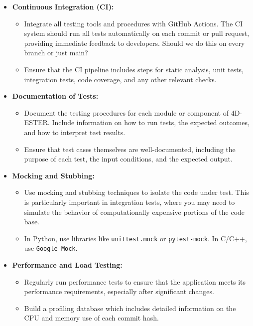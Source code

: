 \documentclass{ol-softwaremanual}
\begin{document}
\begin{itemize}
    \item \textbf{Continuous Integration (CI):}
    \begin{itemize}
        \item Integrate all testing tools and procedures with GitHub Actions. The CI system should run all tests automatically on each commit or pull request, providing immediate feedback to developers. {\color{blue} Should we do this on every branch or just main?}
        \item Ensure that the CI pipeline includes steps for static analysis, unit tests, integration tests, code coverage, and any other relevant checks.
    \end{itemize}
    
    \item \textbf{Documentation of Tests:}
    \begin{itemize}
        \item Document the testing procedures for each module or component of 4D-ESTER. Include information on how to run tests, the expected outcomes, and how to interpret test results.
        \item Ensure that test cases themselves are well-documented, including the purpose of each test, the input conditions, and the expected output.
    \end{itemize}
    
    \item \textbf{Mocking and Stubbing:}
    \begin{itemize}
        \item Use mocking and stubbing techniques to isolate the code under test. This is particularly important in integration tests, where you may need to simulate the behavior of computationally expensive portions of the code base.
        \item In Python, use libraries like \texttt{unittest.mock} or \texttt{pytest-mock}. In C/C++, use \texttt{Google Mock}.
    \end{itemize}
    
    \item \textbf{Performance and Load Testing:}
    \begin{itemize}
        \item Regularly run performance tests to ensure that the application meets its performance requirements, especially after significant changes.
        \item Build a profiling database which includes detailed information on the CPU and memory use of each commit hash.
    \end{itemize}
\end{itemize}    
\end{document}
